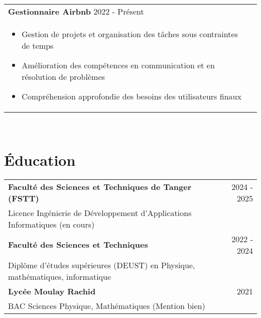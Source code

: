 \documentclass[a4paper,8pt]{article}
\begin{document}
\begin{tabularx}{\linewidth}{ @{}l r@{} }
\color[HTML]{1C033C} \textbf{{Gestionnaire Airbnb}} \hfill \color[HTML]{371e77} 2022 - Présent \\[4pt]
\begin{minipage}[t]{\linewidth}
    \begin{itemize}[nosep,after=\strut, leftmargin=2em, itemsep=2pt]
        \item Gestion de projets et organisation des tâches sous contraintes de temps
        \item Amélioration des compétences en communication et en résolution de problèmes
        \item Compréhension approfondie des besoins des utilisateurs finaux
    \end{itemize}
\end{minipage}
\end{tabularx}
\\
\section{Éducation}
\begin{tabularx}{\linewidth}{ @{}l r@{} }
\color[HTML]{1C033C} \textbf{Faculté des Sciences et Techniques de Tanger (FSTT)} & \hfill \color[HTML]{371e77} 2024 - 2025 \\
\color[HTML]{371e77} Licence Ingénierie de Développement d'Applications Informatiques (en cours) & \hfill \color[HTML]{4B28A4} \\[5pt]
\color[HTML]{1C033C} \textbf{Faculté des Sciences et Techniques} & \hfill \color[HTML]{371e77} 2022 - 2024 \\
\color[HTML]{371e77} Diplôme d'études supérieures (DEUST) en Physique, mathématiques, informatique & \hfill \color[HTML]{4B28A4} \\[5pt]
\color[HTML]{1C033C} \textbf{Lycée Moulay Rachid} & \hfill \color[HTML]{371e77} 2021 \\
\color[HTML]{371e77} BAC Sciences Physique, Mathématiques (Mention bien) & \hfill \color[HTML]{4B28A4}
\end{tabularx}
\\
\end{document}
